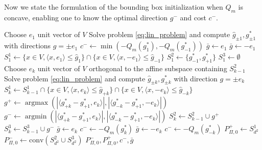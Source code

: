 \documentclass{article}
\newcommand{\1}{\mathbf{1}}
\DeclareMathOperator*{\argmax}{argmax}
\DeclareMathOperator*{\argmin}{argmin}
\theoremstyle{definition}
\theoremstyle{remark}
\begin{document}
\begin{appendices}
Now we state the formulation of the bounding box initialization when $Q_m$ is concave, enabling one to know the optimal direction $g^-$ and cost $c^-$. 
\begin{algorithm}
\caption{Bounding box initialization}\label{alg:bounding_box_cvx}
\begin{algorithmic}[1]
\State Choose $e_1$ unit vector of $V$
\State Solve problem \eqref{eq:lin_problem} and compute $\hat{g}_{\pm 1}, g^*_{\pm 1}$ with directions $g=\pm e_1$ 
\State $c^-\gets \min (-Q_m(g^*_{ 1}),-Q_m(g^*_{ -1}))$
\State $\bar{g}\gets e_1$
\Else
 \State$\bar{g}\gets -e_1$
\EndIf
\State $S^1_{1} \gets \{x\in V, \langle x,  e_1\rangle\leq  \hat{g}_{1}\}\cap \{x\in V, \langle x,  -e_1\rangle\leq  \hat{g}_{-1}\}$
\State $S^2_{1}\gets \{g^*_{-1}, g^*_{+1}\} $
\State $S^3_{1} \gets \emptyset$
   \State Choose $e_k$ unit vector of $V$ orthogonal to the affine subspace containing $S^2_{k-1}$
   \State Solve problem \eqref{eq:lin_problem} and compute $\hat{g}_{\pm k}, g^*_{\pm k}$ with direction $g=\pm e_k$ 
   \State $S^1_{k} \gets S^1_{k-1}\cap\{x\in V, \langle x,  e_k\rangle\leq  \hat{g}_{+k}\}\cap \{x\in V, \langle x,  -e_k\rangle\leq  \hat{g}_{-k}\}$
   \State $g^+\gets\argmax(|\langle g^*_{ +k}-g^*_{+1},e_k\rangle|, |\langle g^*_{ -k}-g^*_{+1},-e_k\rangle|)$
   \State $g^-\gets\argmin(|\langle g^*_{ +k}-g^*_{+1},e_k\rangle|, |\langle g^*_{ -k}-g^*_{+1},-e_k\rangle|)$
   \State $S^2_{k} \gets S^2_{k-1}\cup g^+$
    \State $S^3_{k} \gets S^3_{k-1}\cup g^-$
    \State $\bar{g}\gets e_k$
    \State $c^-\gets -Q_m(g^*_{ k})$
    \Else
    \State $\bar{g}\gets -e_k$
    \State $c^-\gets -Q_m(g^*_{ -k})$
    \EndIf
    \EndIf
\EndFor
\State $P_{\Pi,0}^+\gets S^1_{d^2}$ 
\State $P_{\Pi,0}^-\gets \mathrm{conv}(S^2_{d^2}\cup S^3_{d^2})$
\State\Return $P_{\Pi,0}^-,P_{\Pi,0}^+, c^-, \bar{g}$
\end{algorithmic}
\end{algorithm}
\newpage


\end{appendices}
\end{document}
